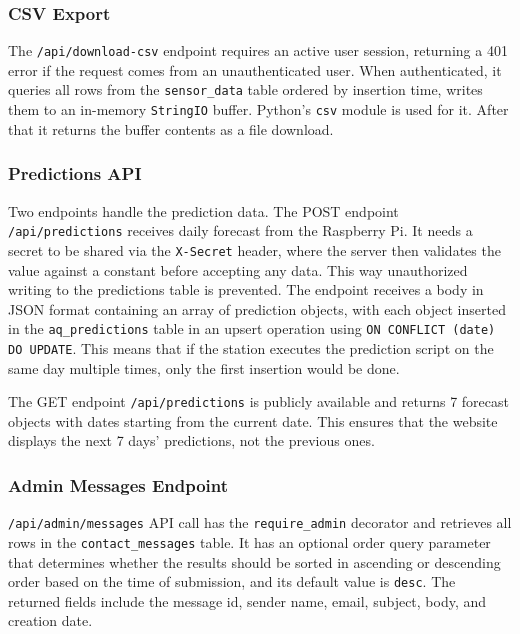 \subsubsection*{CSV Export}

The \texttt{/api/download-csv} endpoint requires an active user session, returning a 401 error
if the request comes from an unauthenticated user. When authenticated, it queries all rows from
the \texttt{sensor\_data} table ordered by insertion time, writes them to an in-memory
\texttt{StringIO} buffer. Python's \texttt{csv} module is used for it. After that it returns
the buffer contents as a file download.

\subsubsection*{Predictions API}

Two endpoints handle the prediction data. The POST endpoint \texttt{/api/predictions} receives
daily forecast from the Raspberry Pi. It needs a secret to be shared via the
\texttt{X-Secret} header, where the server then validates the value against a constant before
accepting any data. This way unauthorized writing to the predictions table is prevented. The
endpoint receives a body in JSON format containing an array of prediction objects, with each
object inserted in the \texttt{aq\_predictions} table in an upsert operation using
\texttt{ON CONFLICT (date) DO UPDATE}. This means that if the station executes the prediction
script on the same day multiple times, only the first insertion would be done.

The GET endpoint \texttt{/api/predictions} is publicly available and returns 7 forecast objects
with dates starting from the current date. This ensures that the website displays the next 7
days' predictions, not the previous ones.

\subsubsection*{Admin Messages Endpoint}

\texttt{/api/admin/messages} API call has the \texttt{require\_admin} decorator and retrieves
all rows in the \texttt{contact\_messages} table. It has an optional order query parameter that
determines whether the results should be sorted in ascending or descending order based on the
time of submission, and its default value is \texttt{desc}. The returned fields include the
message id, sender name, email, subject, body, and creation date.

